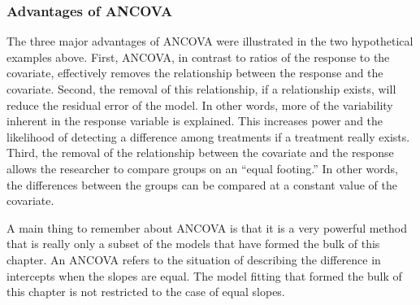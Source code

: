 \documentclass[10pt,openany]{book}\usepackage[]{graphicx}\usepackage[]{color}
\begin{document}
\subsubsection*{Advantages of ANCOVA}
The three major advantages of ANCOVA were illustrated in the two hypothetical examples above.  First, ANCOVA, in contrast to ratios of the response to the covariate, effectively removes the relationship between the response and the covariate. Second, the removal of this relationship, if a relationship exists, will reduce the residual error of the model.  In other words, more of the variability inherent in the response variable is explained.  This increases power and the likelihood of detecting a difference among treatments if a treatment really exists.  Third, the removal of the relationship between the covariate and the response allows the researcher to compare groups on an ``equal footing.'' In other words, the differences between the groups can be compared at a constant value of the covariate.

A main thing to remember about ANCOVA is that it is a very powerful method that is really only a subset of the models that have formed the bulk of this chapter.  An ANCOVA refers to the situation of describing the difference in intercepts when the slopes are equal.  The model fitting that formed the bulk of this chapter is not restricted to the case of equal slopes.
\end{document}
